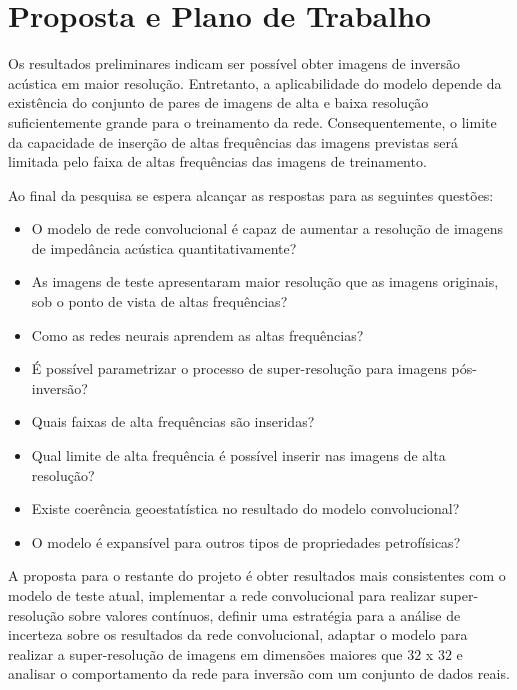\section{Proposta e Plano de Trabalho}

Os resultados preliminares indicam ser possível obter imagens de
inversão acústica em maior resolução. Entretanto, a aplicabilidade
do modelo depende da existência do conjunto de pares de imagens
de alta e baixa resolução suficientemente grande para o treinamento da rede. Consequentemente,
o limite da capacidade de inserção de altas frequências das imagens previstas
será limitada pelo faixa de altas frequências das imagens de treinamento.

Ao final da pesquisa se espera alcançar as respostas para as seguintes questões:
\begin{itemize}
 \item O modelo de rede convolucional é capaz de aumentar a resolução de imagens de impedância acústica
quantitativamente?
 \item As imagens de teste apresentaram maior resolução que as imagens originais, sob o ponto 
de vista de altas frequências?
 \item Como as redes neurais aprendem as altas frequências?
 \item É possível parametrizar o processo de super-resolução para imagens pós-inversão?
 \item Quais faixas de alta frequências são inseridas?
 \item Qual limite de alta frequência é possível inserir nas imagens de alta resolução?
 \item Existe coerência geoestatística no resultado do modelo convolucional?
 \item O modelo é expansível para outros tipos de propriedades petrofísicas?
\end{itemize}

A proposta para o restante do projeto é obter resultados mais consistentes com o modelo de teste atual,
implementar a rede convolucional para realizar super-resolução sobre valores contínuos, definir uma estratégia para
a análise de incerteza sobre os resultados da rede convolucional, adaptar o modelo para realizar a super-resolução
de imagens em dimensões maiores que $32$ x $32$ e analisar o comportamento da rede para inversão
com um conjunto de dados reais.

